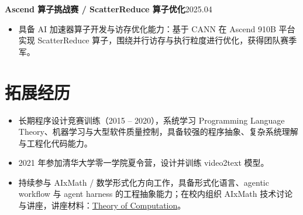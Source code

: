 \documentclass[10pt,a4paper]{ctexart}
\newcommand{\entry}[2]{\textbf{#1}\hfill {#2}}
\newcommand{\link}[2]{\href{#1}{#2}}
\begin{document}
\entry{Ascend 算子挑战赛 / ScatterReduce 算子优化}{2025.04}
\begin{itemize}
  \item 具备 AI 加速器算子开发与访存优化能力：基于 CANN 在 Ascend 910B 平台实现 ScatterReduce 算子，围绕并行访存与执行粒度进行优化，获得团队赛季军。
\end{itemize}

\section*{拓展经历}
\begin{itemize}
  \item 长期程序设计竞赛训练（2015 -- 2020），系统学习 Programming Language Theory、机器学习与大型软件质量控制，具备较强的程序抽象、复杂系统理解与工程化代码能力。
  \item 2021 年参加清华大学零一学院夏令营，设计并训练 video2text 模型。
  \item 持续参与 AIxMath / 数学形式化方向工作，具备形式化语言、agentic workflow 与 agent harness 的工程抽象能力；在校内组织 AIxMath 技术讨论与讲座，讲座材料：\link{https://slides.aixmath.org/Theory-of-Computation/\#/}{Theory of Computation}。
\end{itemize}
\end{document}

